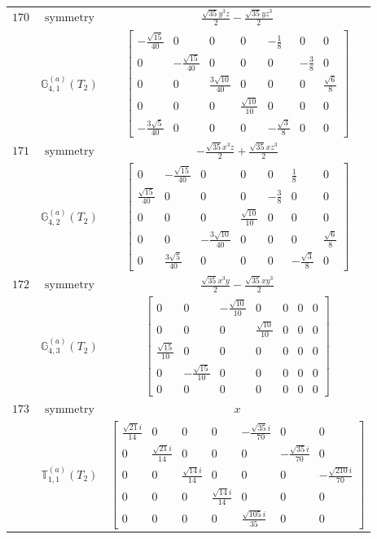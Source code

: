 \documentclass[fleqn,8pt,landscape]{jsarticle}
\begin{document}
\begin{longtable}{ccc}
$ 170 $ & $ \text{symmetry} $ & $ \frac{\sqrt{35} y^{3} z}{2} - \frac{\sqrt{35} y z^{3}}{2} $ \\
$  $ & $ \mathbb{G}_{4,1}^{(a)}(T_{2}) $ & $ \begin{bmatrix} - \frac{\sqrt{15}}{40} & 0 & 0 & 0 & - \frac{1}{8} & 0 & 0 \\ 0 & - \frac{\sqrt{15}}{40} & 0 & 0 & 0 & - \frac{3}{8} & 0 \\ 0 & 0 & \frac{3 \sqrt{10}}{40} & 0 & 0 & 0 & \frac{\sqrt{6}}{8} \\ 0 & 0 & 0 & \frac{\sqrt{10}}{10} & 0 & 0 & 0 \\ - \frac{3 \sqrt{5}}{40} & 0 & 0 & 0 & - \frac{\sqrt{3}}{8} & 0 & 0 \end{bmatrix} $ \\ \hline
$ 171 $ & $ \text{symmetry} $ & $ - \frac{\sqrt{35} x^{3} z}{2} + \frac{\sqrt{35} x z^{3}}{2} $ \\
$  $ & $ \mathbb{G}_{4,2}^{(a)}(T_{2}) $ & $ \begin{bmatrix} 0 & - \frac{\sqrt{15}}{40} & 0 & 0 & 0 & \frac{1}{8} & 0 \\ \frac{\sqrt{15}}{40} & 0 & 0 & 0 & - \frac{3}{8} & 0 & 0 \\ 0 & 0 & 0 & \frac{\sqrt{10}}{10} & 0 & 0 & 0 \\ 0 & 0 & - \frac{3 \sqrt{10}}{40} & 0 & 0 & 0 & \frac{\sqrt{6}}{8} \\ 0 & \frac{3 \sqrt{5}}{40} & 0 & 0 & 0 & - \frac{\sqrt{3}}{8} & 0 \end{bmatrix} $ \\ \hline
$ 172 $ & $ \text{symmetry} $ & $ \frac{\sqrt{35} x^{3} y}{2} - \frac{\sqrt{35} x y^{3}}{2} $ \\
$  $ & $ \mathbb{G}_{4,3}^{(a)}(T_{2}) $ & $ \begin{bmatrix} 0 & 0 & - \frac{\sqrt{10}}{10} & 0 & 0 & 0 & 0 \\ 0 & 0 & 0 & \frac{\sqrt{10}}{10} & 0 & 0 & 0 \\ \frac{\sqrt{15}}{10} & 0 & 0 & 0 & 0 & 0 & 0 \\ 0 & - \frac{\sqrt{15}}{10} & 0 & 0 & 0 & 0 & 0 \\ 0 & 0 & 0 & 0 & 0 & 0 & 0 \end{bmatrix} $ \\ \hline
$ 173 $ & $ \text{symmetry} $ & $ x $ \\
$  $ & $ \mathbb{T}_{1,1}^{(a)}(T_{2}) $ & $ \begin{bmatrix} \frac{\sqrt{21} i}{14} & 0 & 0 & 0 & - \frac{\sqrt{35} i}{70} & 0 & 0 \\ 0 & \frac{\sqrt{21} i}{14} & 0 & 0 & 0 & - \frac{\sqrt{35} i}{70} & 0 \\ 0 & 0 & \frac{\sqrt{14} i}{14} & 0 & 0 & 0 & - \frac{\sqrt{210} i}{70} \\ 0 & 0 & 0 & \frac{\sqrt{14} i}{14} & 0 & 0 & 0 \\ 0 & 0 & 0 & 0 & \frac{\sqrt{105} i}{35} & 0 & 0 \end{bmatrix} $ \\ \hline

\end{longtable}
\end{document}
